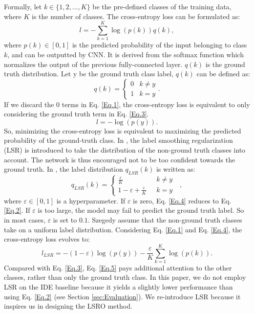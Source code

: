 \documentclass[10pt,twocolumn,letterpaper]{article}
\begin{document}
Formally, let $k\in\{1,2,...,K\}$ be the pre-defined classes of the training data, where $K$ is the number of classes. The cross-entropy loss can be formulated as:
\begin{equation}
l = -\sum_{k=1}^{K} \log{(p(k))}q(k),
\label{Eq.1}
\end{equation}
where $p(k)\in[0,1]$ is the predicted probability of the input belonging to class $k$, and can be outputted by CNN. It is derived from the softmax function which normalizes the output of the previous fully-connected layer. $q(k)$ is the ground truth distribution. Let y be the ground truth class label, $q(k)$ can be defined as:
\begin{equation}
    q(k)=
   \begin{cases}
   0 &\mbox{$k \ne y$}\\
   1 &\mbox{$k = y$}
   \end{cases}.
\label{Eq.2}
\end{equation}
If we discard the $0$ terms in Eq. \ref{Eq.1}, the cross-entropy loss is equivalent to only considering the ground truth term in Eq. \ref{Eq.3}. 
\begin{equation}
    l = - \log{(p(y))}.
\label{Eq.3}
\end{equation}
So, minimizing the cross-entropy loss is equivalent to maximizing the predicted probability of the ground-truth class.
In \cite{szegedy2016rethinking}, the label smoothing regularization (LSR) is introduced to take the distribution of the non-ground truth classes into account. The network is thus encouraged not to be too confident towards the ground truth. In \cite{szegedy2016rethinking}, the label distribution $q_{LSR}(k)$ is written as:
\begin{equation}
    q_{LSR}(k)=
   \begin{cases}
   \frac{\varepsilon}{K} &\mbox{ $k\ne y$ }\\
   1-\varepsilon+\frac{\varepsilon}{K} &\mbox{ $k=y$ }
   \end{cases},
\label{Eq.4}
\end{equation}
where $\varepsilon \in{[0,1]}$ is a hyperparameter. If $\varepsilon$ is zero, Eq. \ref{Eq.4} reduces to Eq. \ref{Eq.2}. If $\varepsilon$ is too large, the model may fail to predict the ground truth label. So in most cases, $\varepsilon$ is set to $0.1$. 
Szegedy \etal assume that the non-ground truth classes take on a uniform label distribution. Considering Eq. \ref{Eq.1} and Eq. \ref{Eq.4}, the cross-entropy loss evolves to:
\begin{equation}
l_{LSR} = - (1-\varepsilon)\log{(p(y))} - \frac{\varepsilon}{K}\sum_{k=1}^{K} \log{(p(k))}.
\label{Eq.5}
\end{equation}
Compared with Eq. \ref{Eq.3}, Eq. \ref{Eq.5} pays additional attention to the other classes, rather than only the ground truth class. In this paper, we do not employ LSR on the IDE baseline because it yields a slightly lower performance than using Eq. \ref{Eq.2} (see Section \ref{sec:Evaluation}). We re-introduce LSR because it inspires us in designing the LSRO method.
\end{document}
